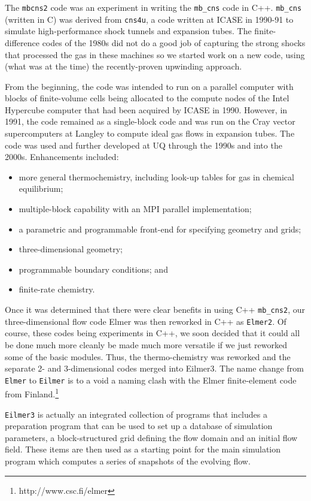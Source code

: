 \documentclass[12pt,a4paper,twoside]{article}
\begin{document}
\medskip
The \texttt{mbcns2} code was an experiment in writing the \texttt{mb\_cns} code in C++.
\texttt{mb\_cns} (written in C) was derived from \texttt{cns4u}, 
a code written at ICASE in 1990-91 to simulate high-performance shock tunnels and expansion tubes.
The finite-difference codes of the 1980s did not do a good job of capturing the strong
shocks that processed the gas in these machines so we started work on a new code, 
using (what was at the time) the recently-proven upwinding approach.

\medskip
From the beginning, the code was intended to run on a parallel computer with 
blocks of finite-volume cells being allocated to the compute nodes of the Intel Hypercube computer
that had been acquired by ICASE in 1990.
However, in 1991, the code remained as a single-block code and was run on the 
Cray vector supercomputers at Langley to compute ideal gas flows in expansion tubes.
The code was used and further developed at UQ through the 1990s and into the 2000s.
Enhancements included:
\begin{itemize}
 \item more general thermochemistry, including look-up tables for gas in chemical equilibrium;
 \item multiple-block capability with an MPI parallel implementation;
 \item a parametric and programmable front-end for specifying geometry and grids;
 \item three-dimensional geometry; 
 \item programmable boundary conditions; and
 \item finite-rate chemistry.
\end{itemize}

\medskip
Once it was determined that there were clear benefits in using C++ \texttt{mb\_cns2},
our three-dimensional flow code Elmer was then reworked in C++ as \texttt{Elmer2}.
Of course, these codes being experiments in C++, we soon decided that it could all be done
much more cleanly be made much more versatile if we just reworked some of the basic modules.
Thus, the thermo-chemistry was reworked and the separate 2- and 3-dimensional codes merged
into Eilmer3.
The name change from \texttt{Elmer} to \texttt{Eilmer} is to a void a naming clash with the Elmer finite-element code 
from Finland.\footnote{http://www.csc.fi/elmer} 

\medskip
\texttt{Eilmer3} is actually an integrated collection of programs that includes a preparation program 
that can be used to set up a database of simulation parameters, 
a block-structured grid defining the flow domain and an initial flow field.
These items are then used as a starting point for the main simulation program
which computes a series of snapshots of the evolving flow.
\end{document}
